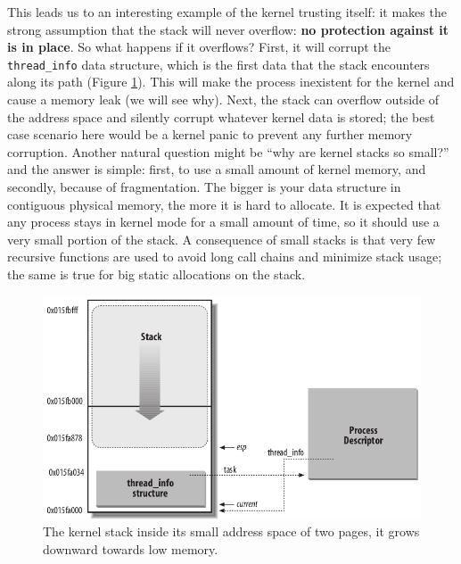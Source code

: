 \documentclass[10pt]{book}
\begin{document}
This leads us to an interesting example of the kernel trusting itself: it makes the strong assumption that the stack will never overflow: \textbf{no protection against it is in place}. So what happens if it overflows? First, it will corrupt the \verb|thread_info| data structure, which is the first data that the stack encounters along its path (Figure \ref{img:stack}). This will make the process inexistent for the kernel and cause a memory leak (we will see why). Next, the stack can overflow outside of the address space and silently corrupt whatever kernel data is stored; the best case scenario here would be a kernel panic to prevent any further memory corruption. Another natural question might be ``why are kernel stacks so small?'' and the answer is simple: first, to use a small amount of kernel memory, and secondly, because of fragmentation. The bigger is your data structure in contiguous physical memory, the more it is hard to allocate. It is expected that any process stays in kernel mode for a small amount of time, so it should use a very small portion of the stack. A consequence of small stacks is that very few recursive functions are used to avoid long call chains and minimize stack usage; the same is true for big static allocations on the stack. %

\begin{figure}[ht]
\includegraphics[width=\textwidth]{images/stack.png}
\caption{The kernel stack inside its small address space of two pages, it grows downward towards low memory.}
\label{img:stack}
\end{figure}
\end{document}
